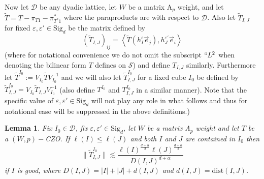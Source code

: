 \documentclass[12pt,reqno ]{amsart}
\numberwithin{equation}{section}
\newtheorem{lemma}[theorem]{Lemma}
\theoremstyle{definition}
\newcommand{\D}{\ensuremath{\mathscr{D}}}
\newcommand{\V}[1]{\ensuremath{\vec{#1}}}
\newcommand{\ip}[2]{\ensuremath{\left\langle#1,#2\right\rangle}}
\newcommand{\W}[1]{\ensuremath{\widetilde{#1}}}
\newcommand{\T}[1]{\ensuremath{\text{#1}}}
\newcommand{\MC}[1]{\ensuremath{\mathcal{#1}}}
\renewcommand{\S}{\ensuremath{\text{Sig}_d}}
\begin{document}
 Now let $\D$ be any dyadic lattice, let $W$ be a matrix A${}_p$ weight, and let $\W{T}  = T - \pi_{T1} - \pi_{T^*1} ^*$ where the paraproducts are with respect to $\D$. Also let $\W{T} _{I, J}$  for fixed $\varepsilon, \varepsilon' \in \S$ be the matrix defined by \begin{equation*} (\W{T} _{I, J})_{ij} = \ip{\widetilde{T}  (h_I ^\varepsilon \V{e}_j)}{h_J ^{\varepsilon'}  \V{e}_i}  \end{equation*} (where for notational convenience we do not omit the subscript $``L^2$ when denoting the bilinear form $T$ defines on $\MC{S}$)  and define $T_{I, J}$ similarly.   Furthermore let $\W{T}^{I_0} := V_{I_0} \W{T} V_{I_0} ^{-1} $ and we will also let $\W{T} _{I, J} ^{I_0}$ for a fixed cube $I_0$ be defined by $\W{T} _{I, J} ^{I_0} =  V_{I_0} \W{T} _{I, J} V_{I_0} ^{-1}$ (also define ${T}^{I_0}$ and ${T} _{I, J} ^{I_0}$ in a similar manner).  Note that the specific value of $\varepsilon, \varepsilon' \in \S$ will not play any role in what follows and thus for notational ease will be suppressed in the above definitions.)



\begin{lemma} \label{TheHuntLem}     Fix $I_0 \in \D$,  fix $\varepsilon, \varepsilon' \in \S$, let $W$ be a matrix A${}_p$ weight and let $T$ be a $(W, p)-$CZO.  If $\ell(I) \leq \ell(J)$ and both $I$ and $J$ are contained in $I_0$ then\begin{equation}  \|   \W{T}^{I_0} _{I, J} \| \lesssim \frac{\ell(I)^\frac{d + \alpha}{2} \ell(J)^\frac{d + \alpha}{2}}{D(I, J)^{d + \alpha}}  \label{HaarMatrixEst}\end{equation} if $I$ is good, where $D(I, J) = |I| + |J| + d(I, J)$ and $d(I, J) = \T{dist}(I, J)$.   \end{lemma}
\end{document}
